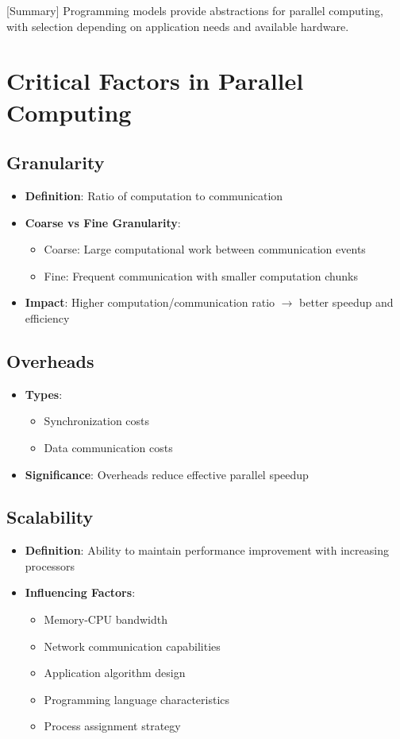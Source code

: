 \documentclass[12pt]{article}
\begin{document}
[Summary] Programming models provide abstractions for parallel computing, with selection depending on application needs and available hardware.

\section{Critical Factors in Parallel Computing}

\subsection{Granularity}
\begin{itemize}
\item \textbf{Definition}: Ratio of computation to communication
\item \textbf{Coarse vs Fine Granularity}:
  \begin{itemize}
  \item Coarse: Large computational work between communication events
  \item Fine: Frequent communication with smaller computation chunks
  \end{itemize}
\item \textbf{Impact}: Higher computation/communication ratio $\rightarrow$ better speedup and efficiency
\end{itemize}

\subsection{Overheads}
\begin{itemize}
\item \textbf{Types}:
  \begin{itemize}
  \item Synchronization costs
  \item Data communication costs
  \end{itemize}
\item \textbf{Significance}: Overheads reduce effective parallel speedup
\end{itemize}

\subsection{Scalability}
\begin{itemize}
\item \textbf{Definition}: Ability to maintain performance improvement with increasing processors
\item \textbf{Influencing Factors}:
  \begin{itemize}
  \item Memory-CPU bandwidth
  \item Network communication capabilities
  \item Application algorithm design
  \item Programming language characteristics
  \item Process assignment strategy
  \end{itemize}
\end{itemize}
\end{document}
